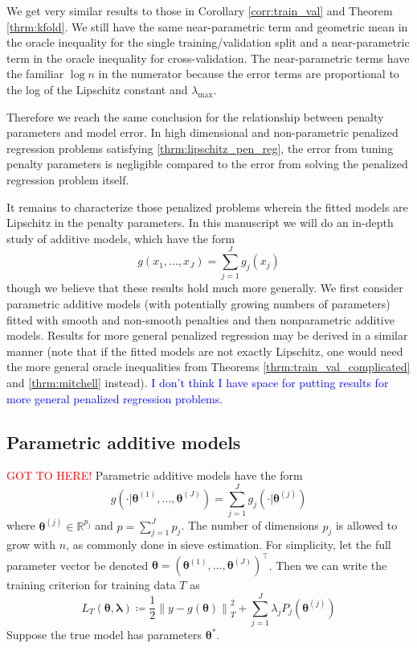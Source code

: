 \documentclass[12pt]{article}
\begin{document}
We get very similar results to those in Corollary \ref{corr:train_val} and Theorem \ref{thrm:kfold}. We still have the same near-parametric term and geometric mean in the oracle inequality for the single training/validation split and a near-parametric term in the oracle inequality for cross-validation. The near-parametric terms have the familiar $\log n$ in the numerator because the error terms are proportional to the log of the Lipschitz constant and $\lambda_{\max}$. 

Therefore we reach the same conclusion for the relationship between penalty parameters and model error. In high dimensional and non-parametric penalized regression problems satisfying \eqref{thrm:lipschitz_pen_reg}, the error from tuning penalty parameters is negligible compared to the error from solving the penalized regression problem itself.

It remains to characterize those penalized problems wherein the fitted models are Lipschitz in the penalty parameters. In this manuscript we will do an in-depth study of additive models, which have the form
\begin{equation}
g(x_1, ..., x_J)= \sum_{j=1}^J g_j(x_j)
\end{equation}
though we believe that these results hold much more generally. We first consider parametric additive models (with potentially growing numbers of parameters) fitted with smooth and non-smooth penalties and then nonparametric additive models. Results for more general penalized regression may be derived in a similar manner (note that if the fitted models are not exactly Lipschitz, one would need the more general oracle inequalities from Theorems \ref{thrm:train_val_complicated} and \ref{thrm:mitchell} instead). \textcolor{blue}{I don't think I have space for putting results for more general penalized regression problems.}

\subsection{Parametric additive models}
\label{sec:param_add_models}
\textcolor{red}{GOT TO HERE!} Parametric additive models have the form
\begin{equation}
g(\cdot | \boldsymbol{\theta}^{(1)}, ..., \boldsymbol{\theta}^{(J)}) = \sum_{j=1}^J g_j(\cdot | \boldsymbol{\theta}^{(j)})
\end{equation}
where $\boldsymbol{\theta}^{(j)} \in \mathbb{R}^{p_j}$ and $p = \sum_{j=1}^J p_j$. The number of dimensions $p_j$ is allowed to grow with $n$, as commonly done in sieve estimation. For simplicity, let the full parameter vector be denoted $\boldsymbol{\theta} = \left (\boldsymbol{\theta}^{(1)}, ..., \boldsymbol{\theta}^{(J)} \right )^\top$. Then we can write the training criterion for training data $T$ as
\begin{equation}
\label{eq:param_add}
L_T \left (\boldsymbol{\theta}, \boldsymbol{\lambda} \right) 
\coloneqq \frac{1}{2} \left  \| y -  g(\boldsymbol{\theta}) \right \|^2_T 
+ \sum_{j=1}^J \lambda_j P_j(\boldsymbol{\theta}^{(j)})
\end{equation}
Suppose the true model has parameters $\boldsymbol{\theta}^*$.
\end{document}
